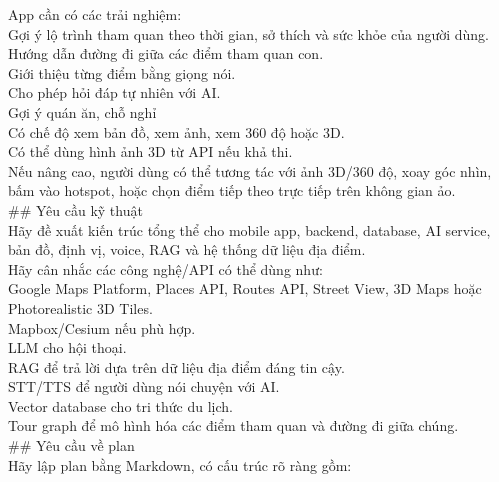 \begin{enumerate}
App cần có các trải nghiệm: \\
\* Gợi ý lộ trình tham quan theo thời gian, sở thích và sức khỏe của người dùng. \\
\* Hướng dẫn đường đi giữa các điểm tham quan con. \\
\* Giới thiệu từng điểm bằng giọng nói. \\
\* Cho phép hỏi đáp tự nhiên với AI. \\
\* Gợi ý quán ăn, chỗ nghỉ \\
\* Có chế độ xem bản đồ, xem ảnh, xem 360 độ hoặc 3D. \\
\* Có thể dùng hình ảnh 3D từ API nếu khả thi. \\
\* Nếu nâng cao, người dùng có thể tương tác với ảnh 3D/360 độ, xoay góc nhìn, bấm vào hotspot, hoặc chọn điểm tiếp theo trực tiếp trên không gian ảo. \\


\#\# Yêu cầu kỹ thuật \\

Hãy đề xuất kiến trúc tổng thể cho mobile app, backend, database, AI service, bản đồ, định vị, voice, RAG và hệ thống dữ liệu địa điểm. \\

Hãy cân nhắc các công nghệ/API có thể dùng như: \\
\* Google Maps Platform, Places API, Routes API, Street View, 3D Maps hoặc Photorealistic 3D Tiles. \\
\* Mapbox/Cesium nếu phù hợp. \\
\* LLM cho hội thoại. \\
\* RAG để trả lời dựa trên dữ liệu địa điểm đáng tin cậy. \\
\* STT/TTS để người dùng nói chuyện với AI. \\
\* Vector database cho tri thức du lịch. \\
\* Tour graph để mô hình hóa các điểm tham quan và đường đi giữa chúng. \\


\#\# Yêu cầu về plan \\

Hãy lập plan bằng Markdown, có cấu trúc rõ ràng gồm: \\


\end{enumerate}

